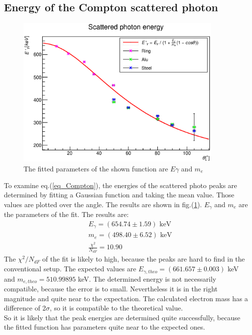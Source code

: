 \documentclass{article}
\begin{document}
\subsection{Energy of the Compton scattered photon}
\begin{figure}[H]
    \centering
    \includegraphics[width=0.9\textwidth]{Graphen/compton_spektren/compton.eps}
    \caption{The fitted parameters of the shown function are $E\gamma$ and $m_e$}
    \label{figure_compton}
\end{figure}
To examine eq.(\ref{eq_Compton}), the energies of the scattered photo peaks are determined by fitting a Gaussian function and taking the mean value. Those values are plotted over the angle.
The results are shown in fig.(\ref{figure_compton}). $E_\gamma$ and $m_e$ are the parameters of the fit. The results are:
\begin{align*}
    & E_\gamma = (654.74 \pm 1.59)\mbox{ keV}\\
    & m_e = (498.40 \pm 6.52)\mbox{ keV}\\
    & \frac{\chi^2}{N_{dF}} = 10.90
\end{align*}
The $\chi^2/N_{dF}$ of the fit is likely to high, because the peaks are hard to find in the conventional setup.
The expected values are $E_{\gamma, theo} = (661.657 \pm 0.003)$ keV and $m_{e, theo} = 510.99895 $ keV. The determined energy is not necessarily compatible, because the error is to small. Nevertheless it is in the right magnitude and quite near to the expectation. The calculated electron mass has a difference of 2$\sigma$, so it is compatible to the theoretical value.\\
So it is likely that the peak energies are determined quite successfully, because the fitted function has parameters quite near to the expected ones.
\end{document}
